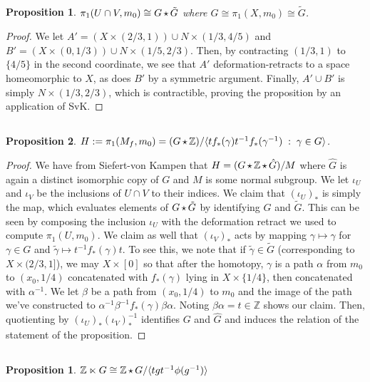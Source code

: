 \documentclass[english]{article}
\newcommand{\ZZ}{\mathbb{Z}}
\newcommand{\prt}[1]{\setcounter{subsection}{#1-1}\subsection{}}
\newtheorem{proposition}[theorem]{Proposition}
\newtheorem*{proposition*}{Proposition}
\theoremstyle{remark}
\theoremstyle{definition}
\newcommand{\frp}{\mathop{\large {\mathlarger{\star}}}}
\begin{document}
\prt{4} \begin{proposition*}
	$\pi_1(U\cap V,m_0)\cong G\frp \tilde{G}$ where $G\cong \pi_1(X,m_0)\cong \tilde{G}$.
\end{proposition*}
\begin{proof}
	We let $A'=(X\times (2/3,1))\cup N\times (1/3,4/5) $ and $B'=(X\times (0,1/3))\cup N\times (1/5,2/3) $. Then, by contracting $(1/3,1)$ to $\{4/5\}$ in the second coordinate, we see that $A'$ deformation-retracts to a space homeomorphic to $X$, as does $B'$ by a symmetric argument. Finally, $A'\cup B'$ is simply $N\times (1/3,2/3)$, which is contractible, proving the proposition by an application of SvK. 
\end{proof}
\prt{5}\begin{proposition*}
	$H:=\pi_1(M_f,m_0)=(G\frp \ZZ)/\langle tf_*(\gamma)t^{-1}f_*(\gamma^{-1})\;:\; \gamma \in G\rangle$.
\end{proposition*}\begin{proof}
We have from Siefert-von Kampen that $H=(G\frp \ZZ\frp \hat{G})/M$ where $\hat{G}$ is again a distinct isomorphic copy of $G$ and $M$ is some normal subgroup. We let $\iota_U$ and $\iota_V$ be the inclusions of $U\cap V$ to their indices. We claim that $(\iota_U)_*$ is simply the  map, which evaluates elements of $G\frp \tilde{G}$ by identifying $G$ and $\tilde{G}$. This can be seen by composing the inclusion $\iota_U$ with the deformation retract we used to compute $\pi_1(U,m_0)$. We claim as well that $(\iota_V)_*$ acts by mapping $\gamma\mapsto \gamma$ for $\gamma\in G$ and $\tilde{\gamma}\mapsto t^{-1}f_*(\gamma)t$. To see this, we note that if $\tilde{\gamma}\in \tilde{G}$ (corresponding to $X\times(2/3,1]$), we may  $X\times[0]$ so that after the homotopy, $\gamma$ is a path $\alpha$ from $m_0$  to $(x_0,1/4)$ concatenated with $f_*(\gamma)$ lying in $X\times \{1/4\}$, then concatenated with $\alpha^{-1}$. We let $\beta$ be a path from $(x_0,1/4)$ to $m_0$  and  the image of the path we've constructed to $\alpha^{-1}\beta^{-1}f_*(\gamma) \beta\alpha$. Noting $\beta \alpha=t\in \ZZ$ shows our claim. Then, quotienting by $(\iota_U)_*(\iota_V)_*^{-1}$ identifies $G$ and $\hat{G}$ and induces the relation of the statement of the proposition. 
\end{proof}
\prt{6}
\begin{proposition}
	$\ZZ\ltimes G\cong \ZZ\frp G/\langle tgt^{-1}\phi(g^{-1})\rangle$
\end{proposition}
\end{document}
